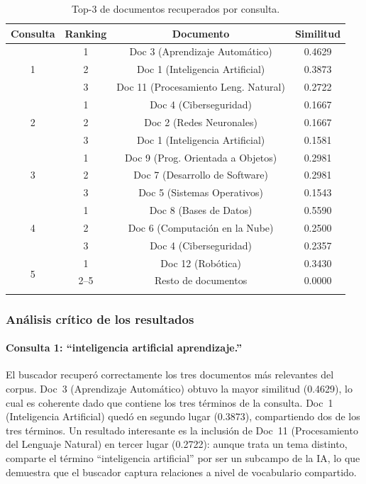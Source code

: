\begin{table}[H]
\centering
\caption{Top-3 de documentos recuperados por consulta.}
\label{tab:resultados}
\begin{tabular}{|c|c|c|c|}
\hline
\textbf{Consulta} & \textbf{Ranking} & \textbf{Documento} & \textbf{Similitud} \\
\hline
\multirow{3}{*}{1} & 1 & Doc 3 (Aprendizaje Automático) & 0.4629 \\
                   & 2 & Doc 1 (Inteligencia Artificial) & 0.3873 \\
                   & 3 & Doc 11 (Procesamiento Leng. Natural) & 0.2722 \\
\hline
\multirow{3}{*}{2} & 1 & Doc 4 (Ciberseguridad) & 0.1667 \\
                   & 2 & Doc 2 (Redes Neuronales) & 0.1667 \\
                   & 3 & Doc 1 (Inteligencia Artificial) & 0.1581 \\
\hline
\multirow{3}{*}{3} & 1 & Doc 9 (Prog. Orientada a Objetos) & 0.2981 \\
                   & 2 & Doc 7 (Desarrollo de Software) & 0.2981 \\
                   & 3 & Doc 5 (Sistemas Operativos) & 0.1543 \\
\hline
\multirow{3}{*}{4} & 1 & Doc 8 (Bases de Datos) & 0.5590 \\
                   & 2 & Doc 6 (Computación en la Nube) & 0.2500 \\
                   & 3 & Doc 4 (Ciberseguridad) & 0.2357 \\
\hline
\multirow{3}{*}{5} & 1 & Doc 12 (Robótica) & 0.3430 \\
                   & 2--5 & Resto de documentos & 0.0000 \\
                   & & & \\
\hline
\end{tabular}
\end{table}

\subsubsection{Análisis crítico de los resultados}

\paragraph{Consulta 1: ``inteligencia artificial aprendizaje.''}
El buscador recuperó correctamente los tres documentos más relevantes del corpus. Doc~3 (Aprendizaje Automático) obtuvo la mayor similitud (0.4629), lo cual es coherente dado que contiene los tres términos de la consulta. Doc~1 (Inteligencia Artificial) quedó en segundo lugar (0.3873), compartiendo dos de los tres términos. Un resultado interesante es la inclusión de Doc~11 (Procesamiento del Lenguaje Natural) en tercer lugar (0.2722): aunque trata un tema distinto, comparte el término ``inteligencia artificial'' por ser un subcampo de la IA, lo que demuestra que el buscador captura relaciones a nivel de vocabulario compartido.

